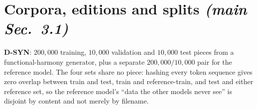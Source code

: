 \documentclass{article}
\begin{document}
\section{Corpora, editions and splits \normalfont\textit{(main Sec.~3.1)}}

%
\textbf{D-SYN}: $200{,}000$ training, $10{,}000$ validation and $10{,}000$
test pieces from a functional-harmony generator, plus a separate $200{,}000/10{,}000$
pair for the reference model. The four sets share no piece: hashing every token
sequence gives zero overlap between train and test, train and reference-train, and
test and either reference set, so the reference model's ``data the other models never
see'' is disjoint by content and not merely by filename.
\end{document}
